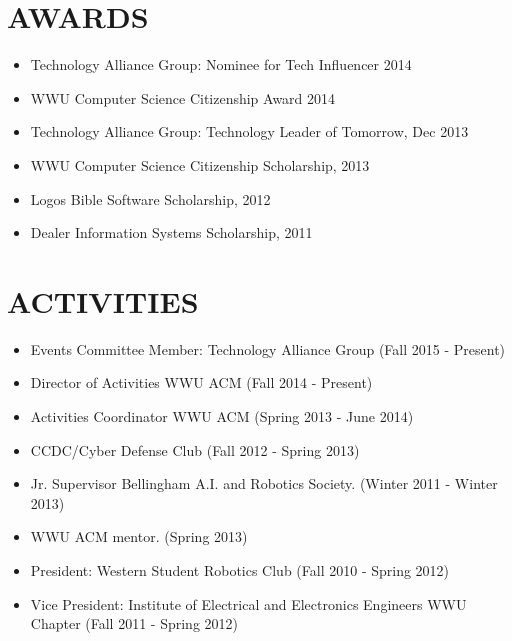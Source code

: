 \documentclass[line,margin]{res}
\begin{document}
\begin{resume}
	
\section{AWARDS}
	\begin{itemize} \itemsep -3pt
		\item Technology Alliance Group: Nominee for Tech Influencer 2014
		\item WWU Computer Science Citizenship Award 2014
		\item Technology Alliance Group: Technology Leader of Tomorrow, Dec 2013
		\item WWU Computer Science Citizenship Scholarship, 2013
		\item Logos Bible Software Scholarship, 2012
		\item Dealer Information Systems Scholarship, 2011
	\end{itemize}

\section{ACTIVITIES} 
	\begin{itemize} \itemsep -3pt
	\item Events Committee Member: Technology Alliance Group {\footnotesize (Fall 2015 - Present)}
	\item Director of Activities WWU ACM {\footnotesize (Fall 2014 - Present)}
	\item Activities Coordinator WWU ACM {\footnotesize (Spring 2013 - June 2014)}
	\item CCDC/Cyber Defense Club {\footnotesize (Fall 2012 - Spring 2013)}
	\item Jr. Supervisor Bellingham A.I. and Robotics Society. {\footnotesize (Winter 2011 - Winter 2013)}
	\item WWU ACM mentor. {\footnotesize (Spring 2013)}
	\item President: Western Student Robotics Club {\footnotesize(Fall 2010 - Spring 2012)}
 	\item Vice President: Institute of Electrical and Electronics Engineers WWU Chapter {\footnotesize(Fall 2011 - Spring 2012)}
	\end{itemize}
	
\end{resume}
\end{document}
